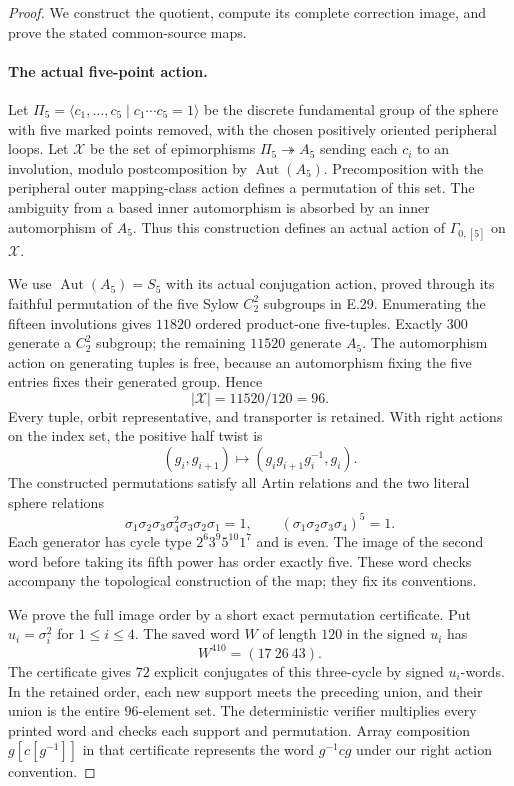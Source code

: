 \begin{proof}
We construct the quotient, compute its complete correction image,
and prove the stated common-source maps.

\paragraph{The actual five-point action.}
Let $\Pi_5=\langle c_1,\ldots,c_5\mid c_1\cdots c_5=1\rangle$
be the discrete fundamental group of the sphere with five marked
points removed, with the chosen positively oriented peripheral
loops.  Let $\mathcal X$ be the set of epimorphisms
$\Pi_5\twoheadrightarrow A_5$ sending each $c_i$ to an involution,
modulo postcomposition by $\operatorname{Aut}(A_5)$.
Precomposition with the peripheral outer mapping-class action
defines a permutation of this set.  The ambiguity from a based
inner automorphism is absorbed by an inner automorphism of $A_5$.
Thus this construction defines an actual action of
$\Gamma_{0,[5]}$ on $\mathcal X$.

We use $\operatorname{Aut}(A_5)=S_5$ with its actual conjugation
action, proved through its faithful permutation of the five
Sylow $C_2^2$ subgroups in E.29.  Enumerating the fifteen
involutions gives $11820$ ordered product-one five-tuples.
Exactly $300$ generate a $C_2^2$ subgroup; the remaining $11520$
generate $A_5$.  The automorphism action on generating tuples
is free, because an automorphism fixing the five entries fixes
their generated group.  Hence
\[
                         |\mathcal X|=11520/120=96.
 \tag{E.46.6}
\]
Every tuple, orbit representative, and transporter is retained.
With right actions on the index set, the positive half twist is
\[
 (g_i,g_{i+1})\longmapsto
              (g_ig_{i+1}g_i^{-1},g_i).
 \tag{E.46.7}
\]
The constructed permutations satisfy all Artin relations and
the two literal sphere relations
\[
 \sigma_1\sigma_2\sigma_3\sigma_4^2\sigma_3\sigma_2\sigma_1=1,
       \qquad (\sigma_1\sigma_2\sigma_3\sigma_4)^5=1.
 \tag{E.46.8}
\]
Each generator has cycle type $2^6 3^9 5^{10}1^7$ and is even.
The image of the second word before taking its fifth power
has order exactly five.  These word checks accompany the
topological construction of the map; they fix its conventions.

We prove the full image order by a short exact permutation
certificate.  Put $u_i=\sigma_i^2$ for $1\le i\le4$.
The saved word $W$ of length $120$ in the signed $u_i$ has
\[
                          W^{410}=(17\ 26\ 43).
 \tag{E.46.9}
\]
The certificate gives $72$ explicit conjugates of this
three-cycle by signed $u_i$-words.  In the retained order,
each new support meets the preceding union, and their union
is the entire $96$-element set.  The deterministic verifier
multiplies every printed word and checks each support and
permutation.  Array composition $g[c[g^{-1}]]$ in that
certificate represents the word $g^{-1}cg$ under our right
action convention.


\end{proof}
